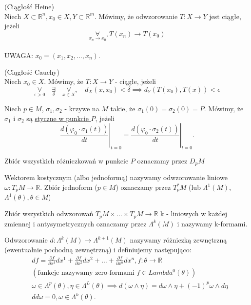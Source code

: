 \documentclass{article}
\begin{document}
\begin{definicja}
(Ciągłość Heine)\\
Niech $X\subset\mathbb{R}^n, x_{0} \in X, Y\subset\mathbb{R}^m$. Mówimy, że odwzorowanie $T: X\rightarrow Y$ jest ciągłe, jeżeli $$\underset{x_n \to x_0}{\forall}, T(x_{n})\rightarrow T(x_{0})$$\\
UWAGA: $x_{0} = (x_{1}, x_{2}, ..., x_{n})$.
\end{definicja}
\begin{definicja}
(Ciągłość Cauchy)\\
Niech $x_{0}\in X$. Mówimy, że $T: X\to Y$ - ciągłe, jeżeli
$$\underset{\epsilon > 0}{\forall} \quad\underset{\delta}{\exists} \quad\underset{x\in X}{\forall}, \quad d_{X} (x,x_{0}) < \delta \implies d_{Y} (T(x_{0}), T(x)) < \epsilon$$
\end{definicja}
\begin{definicja}
Niech $p\in M$, $\sigma_1,\sigma_2$ - krzywe na $M$ takie, że $\sigma_1(0) = \sigma_2(0) = P$. Mówimy, że $\sigma_1$ i $\sigma_2$ są \underline{styczne w punkcie $P$}, jeżeli
\[
\left.\frac{d(\varphi_0\cdot \sigma_1(t))}{d t}\right|_{t=0} = \left.\frac{d(\varphi_0 \cdot \sigma_2(t))}{dt}\right|_{t=0}
.\]
\end{definicja}
\begin{definicja}
Zbiór wszystkich różniczkowań w punkcie $P$ oznaczamy przez $D_pM$
\end{definicja}
\begin{definicja}
Wektorem kostycznym (albo jednoformą) nazywamy odwzorowanie liniowe  $\omega: T_pM\to\mathbb{R}$.
Zbiór jednoform ($p\in M$) oznaczamy przez $T_p^* M$ (lub $\Lambda^1(M)$, $\Lambda^1(\theta), \theta\in M$)
\end{definicja}
\begin{definicja}
Zbiór wszystkich odwzorowań $T_pM \times \ldots \times T_pM \to \mathbb{R}$ k - liniowych w każdej zmiennej i antysymetrycznych oznaczamy przez $\Lambda^k(M)$ i nazywamy k-formami.
\end{definicja}
\begin{definicja}
Odwzorowanie $d: \Lambda^k(M)\to\Lambda^{k+1}(M)$ nazywamy różniczką zewnętrzną (ewentualnie pochodną zewnętrzną) i definiujemy następująco:
\begin{align*}
&df = \frac{\partial f}{\partial x^1} dx^1 + \frac{\partial f}{\partial x^2} dx^2 + \ldots + \frac{\partial f}{\partial x^n} dx^n, f: \theta \to \mathbb{R}\\
&(\text{funkcje nazywamy zero-formami }f\in Lambda^0(\theta))\\
&\omega\in\Lambda^p(\theta), \eta\in \Lambda^L(\theta) \implies d(\omega\land\eta) = d\omega\land\eta + (-1)^p\omega\land d\eta \\
&dd\omega = 0, \omega\in\Lambda^k(\theta)
.\end{align*}
\end{definicja}
\end{document}

